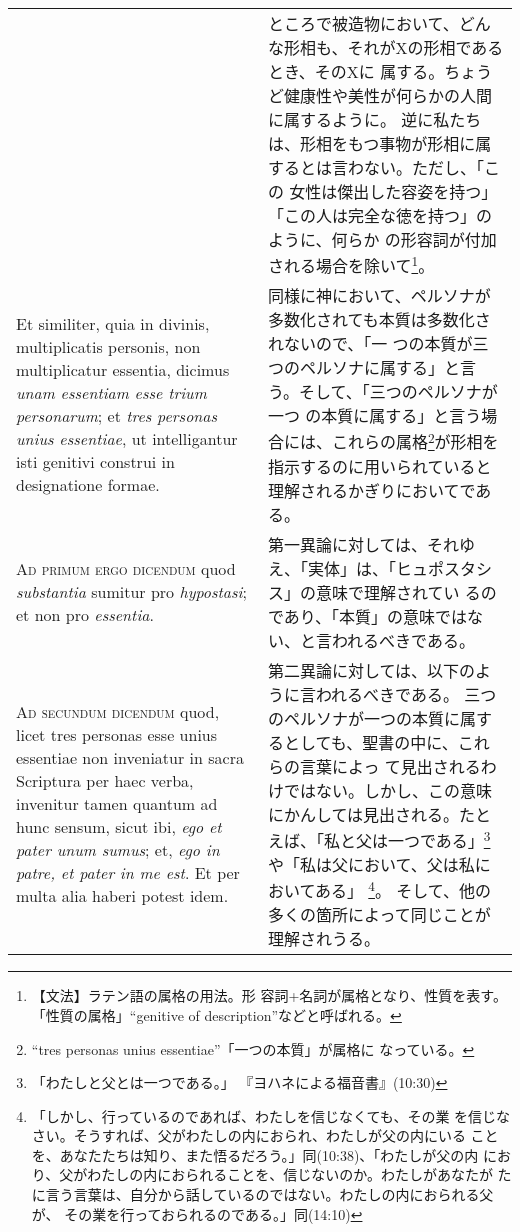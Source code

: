 \documentclass[10pt]{jsarticle} %
\begin{document}
\begin{longtable}{p{21em}p{21em}}
&

ところで被造物において、どんな形相も、それがXの形相であるとき、そのXに
 属する。ちょうど健康性や美性が何らかの人間に属するように。
逆に私たちは、形相をもつ事物が形相に属するとは言わない。ただし、「この
女性は傑出した容姿を持つ」「この人は完全な徳を持つ」のように、何らか
 の形容詞が付加される場合を除いて\footnote{【文法】ラテン語の属格の用法。形
 容詞+名詞が属格となり、性質を表す。「性質の属格」``genitive of
 description''などと呼ばれる。}。

\\


Et similiter, quia in divinis, multiplicatis personis, non
multiplicatur essentia, dicimus {\itshape unam essentiam esse trium personarum}; et
{\itshape tres personas unius essentiae}, ut intelligantur isti genitivi construi
in designatione formae.


&

同様に神において、ペルソナが多数化されても本質は多数化されないので、「一
 つの本質が三つのペルソナに属する」と言う。そして、「三つのペルソナが一つ
 の本質に属する」と言う場合には、これらの属格\footnote{``tres personas
 unius essentiae''「一つの本質」が属格に
 なっている。}が形相を指示するのに用いられていると理解されるかぎりにおいてである。

\\




{\scshape Ad primum ergo dicendum} quod {\itshape substantia} sumitur pro {\itshape hypostasi}; et non
pro {\itshape essentia}.


&

第一異論に対しては、それゆえ、「実体」は、「ヒュポスタシス」の意味で理解されてい
 るのであり、「本質」の意味ではない、と言われるべきである。

\\



{\scshape Ad secundum dicendum} quod, licet tres personas esse unius essentiae non
inveniatur in sacra Scriptura per haec verba, invenitur tamen quantum ad
hunc sensum, sicut ibi, {\itshape ego et pater unum sumus}; et, {\itshape ego in patre, et
pater in me est}. Et per multa alia haberi potest idem.


&

第二異論に対しては、以下のように言われるべきである。
三つのペルソナが一つの本質に属するとしても、聖書の中に、これらの言葉によっ
 て見出されるわけではない。しかし、この意味にかんしては見出される。たと
 えば、「私と父は一つである」\footnote{「わたしと父とは一つである。」
 『ヨハネによる福音書』(10:30)}や「私は父において、父は私においてある」
 \footnote{「しかし、行っているのであれば、わたしを信じなくても、その業
 を信じなさい。そうすれば、父がわたしの内におられ、わたしが父の内にいる
 ことを、あなたたちは知り、また悟るだろう。」同(10:38)、「わたしが父の内
 におり、父がわたしの内におられることを、信じないのか。わたしがあなたが
 たに言う言葉は、自分から話しているのではない。わたしの内におられる父が、
 その業を行っておられるのである。」同(14:10)}。
 そして、他の多くの箇所によって同じことが理解されうる。



\end{longtable}
\end{document}
